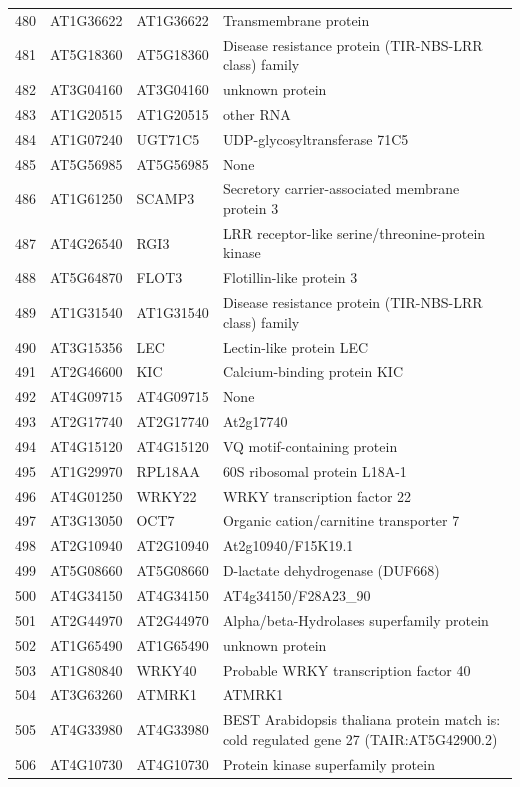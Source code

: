 \documentclass[11pt]{article}
\begin{document}
\begin{center}
\begin{tabular}{rlll}
480 & AT1G36622 & AT1G36622 & Transmembrane protein\\
481 & AT5G18360 & AT5G18360 & Disease resistance protein (TIR-NBS-LRR class) family\\
482 & AT3G04160 & AT3G04160 & unknown protein\\
483 & AT1G20515 & AT1G20515 & other RNA\\
484 & AT1G07240 & UGT71C5 & UDP-glycosyltransferase 71C5\\
485 & AT5G56985 & AT5G56985 & None\\
486 & AT1G61250 & SCAMP3 & Secretory carrier-associated membrane protein 3\\
487 & AT4G26540 & RGI3 & LRR receptor-like serine/threonine-protein kinase\\
488 & AT5G64870 & FLOT3 & Flotillin-like protein 3\\
489 & AT1G31540 & AT1G31540 & Disease resistance protein (TIR-NBS-LRR class) family\\
490 & AT3G15356 & LEC & Lectin-like protein LEC\\
491 & AT2G46600 & KIC & Calcium-binding protein KIC\\
492 & AT4G09715 & AT4G09715 & None\\
493 & AT2G17740 & AT2G17740 & At2g17740\\
494 & AT4G15120 & AT4G15120 & VQ motif-containing protein\\
495 & AT1G29970 & RPL18AA & 60S ribosomal protein L18A-1\\
496 & AT4G01250 & WRKY22 & WRKY transcription factor 22\\
497 & AT3G13050 & OCT7 & Organic cation/carnitine transporter 7\\
498 & AT2G10940 & AT2G10940 & At2g10940/F15K19.1\\
499 & AT5G08660 & AT5G08660 & D-lactate dehydrogenase (DUF668)\\
500 & AT4G34150 & AT4G34150 & AT4g34150/F28A23\_90\\
501 & AT2G44970 & AT2G44970 & Alpha/beta-Hydrolases superfamily protein\\
502 & AT1G65490 & AT1G65490 & unknown protein\\
503 & AT1G80840 & WRKY40 & Probable WRKY transcription factor 40\\
504 & AT3G63260 & ATMRK1 & ATMRK1\\
505 & AT4G33980 & AT4G33980 & BEST Arabidopsis thaliana protein match is: cold regulated gene 27 (TAIR:AT5G42900.2)\\
506 & AT4G10730 & AT4G10730 & Protein kinase superfamily protein\\

\end{tabular}
\end{center}
\end{document}
